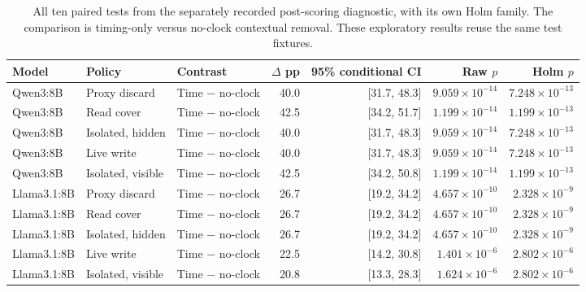 \begin{table}[t]\centering\small
\caption{All ten paired tests from the separately recorded post-scoring diagnostic, with its own Holm family. The comparison is timing-only versus no-clock contextual removal. These exploratory results reuse the same test fixtures.}\label{tab:b1-ablation-pairs}
\setlength{\tabcolsep}{4pt}
\begin{tabularx}{\textwidth}{@{}lP{.12\textwidth}Yrrrr@{}}\toprule
Model & Policy & Contrast & $\Delta$ pp & 95\% conditional CI & Raw $p$ & Holm $p$ \\\midrule
Qwen3:8B & Proxy discard & Time $-$ no-clock & 40.0 & [31.7, 48.3] & $9.059\times10^{-14}$ & $7.248\times10^{-13}$ \\
Qwen3:8B & Read cover & Time $-$ no-clock & 42.5 & [34.2, 51.7] & $1.199\times10^{-14}$ & $1.199\times10^{-13}$ \\
Qwen3:8B & Isolated, hidden & Time $-$ no-clock & 40.0 & [31.7, 48.3] & $9.059\times10^{-14}$ & $7.248\times10^{-13}$ \\
Qwen3:8B & Live write & Time $-$ no-clock & 40.0 & [31.7, 48.3] & $9.059\times10^{-14}$ & $7.248\times10^{-13}$ \\
Qwen3:8B & Isolated, visible & Time $-$ no-clock & 42.5 & [34.2, 50.8] & $1.199\times10^{-14}$ & $1.199\times10^{-13}$ \\
Llama3.1:8B & Proxy discard & Time $-$ no-clock & 26.7 & [19.2, 34.2] & $4.657\times10^{-10}$ & $2.328\times10^{-9}$ \\
Llama3.1:8B & Read cover & Time $-$ no-clock & 26.7 & [19.2, 34.2] & $4.657\times10^{-10}$ & $2.328\times10^{-9}$ \\
Llama3.1:8B & Isolated, hidden & Time $-$ no-clock & 26.7 & [19.2, 34.2] & $4.657\times10^{-10}$ & $2.328\times10^{-9}$ \\
Llama3.1:8B & Live write & Time $-$ no-clock & 22.5 & [14.2, 30.8] & $1.401\times10^{-6}$ & $2.802\times10^{-6}$ \\
Llama3.1:8B & Isolated, visible & Time $-$ no-clock & 20.8 & [13.3, 28.3] & $1.624\times10^{-6}$ & $2.802\times10^{-6}$ \\
\bottomrule\end{tabularx}\end{table}
